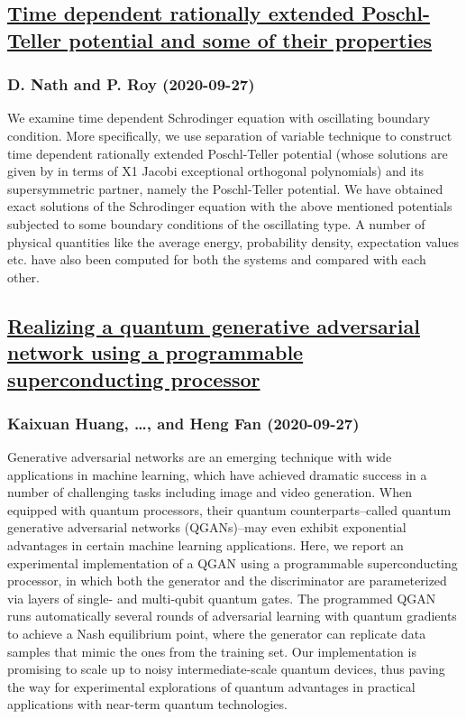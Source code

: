 \subsection*{\href{http://arxiv.org/abs/2009.12851v1}{Time dependent rationally extended Poschl-Teller potential and some of  their properties}}
\subsubsection*{D. Nath and P. Roy (2020-09-27)}
We examine time dependent Schrodinger equation with oscillating boundary
condition. More specifically, we use separation of variable technique to
construct time dependent rationally extended Poschl-Teller potential (whose
solutions are given by in terms of X1 Jacobi exceptional orthogonal
polynomials) and its supersymmetric partner, namely the Poschl-Teller
potential. We have obtained exact solutions of the Schrodinger equation with
the above mentioned potentials subjected to some boundary conditions of the
oscillating type. A number of physical quantities like the average energy,
probability density, expectation values etc. have also been computed for both
the systems and compared with each other.

\subsection*{\href{http://arxiv.org/abs/2009.12827v1}{Realizing a quantum generative adversarial network using a programmable  superconducting processor}}
\subsubsection*{Kaixuan Huang, \dots, and Heng Fan (2020-09-27)}
Generative adversarial networks are an emerging technique with wide
applications in machine learning, which have achieved dramatic success in a
number of challenging tasks including image and video generation. When equipped
with quantum processors, their quantum counterparts--called quantum generative
adversarial networks (QGANs)--may even exhibit exponential advantages in
certain machine learning applications. Here, we report an experimental
implementation of a QGAN using a programmable superconducting processor, in
which both the generator and the discriminator are parameterized via layers of
single- and multi-qubit quantum gates. The programmed QGAN runs automatically
several rounds of adversarial learning with quantum gradients to achieve a Nash
equilibrium point, where the generator can replicate data samples that mimic
the ones from the training set. Our implementation is promising to scale up to
noisy intermediate-scale quantum devices, thus paving the way for experimental
explorations of quantum advantages in practical applications with near-term
quantum technologies.

